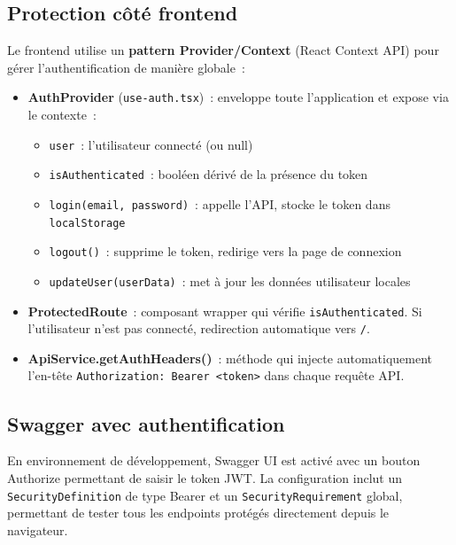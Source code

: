 \subsection{Protection côté frontend}

Le frontend utilise un \textbf{pattern Provider/Context} (React Context API) pour gérer l'authentification de manière globale~:

\begin{itemize}
    \item \textbf{AuthProvider} (\texttt{use-auth.tsx})~: enveloppe toute l'application et expose via le contexte~:
    \begin{itemize}
        \item \texttt{user}~: l'utilisateur connecté (ou null)
        \item \texttt{isAuthenticated}~: booléen dérivé de la présence du token
        \item \texttt{login(email, password)}~: appelle l'API, stocke le token dans \texttt{localStorage}
        \item \texttt{logout()}~: supprime le token, redirige vers la page de connexion
        \item \texttt{updateUser(userData)}~: met à jour les données utilisateur locales
    \end{itemize}
    
    \item \textbf{ProtectedRoute}~: composant wrapper qui vérifie \texttt{isAuthenticated}. Si l'utilisateur n'est pas connecté, redirection automatique vers \texttt{/}.
    
    \item \textbf{ApiService.getAuthHeaders()}~: méthode qui injecte automatiquement l'en-tête \texttt{Authorization: Bearer <token>} dans chaque requête API.
\end{itemize}

\subsection{Swagger avec authentification}

En environnement de développement, Swagger UI est activé avec un bouton \og Authorize \fg{} permettant de saisir le token JWT. La configuration inclut un \texttt{SecurityDefinition} de type Bearer et un \texttt{SecurityRequirement} global, permettant de tester tous les endpoints protégés directement depuis le navigateur.

